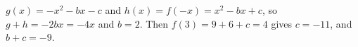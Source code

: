$g(x)=-x^2-bx-c$ and $h(x)=f(-x)=x^2-bx+c$, so $g+h=-2bx=-4x$ and $b=2$. Then $f(3)=9+6+c=4$ gives $c=-11$, and $b+c=\boxed{-9}$.
